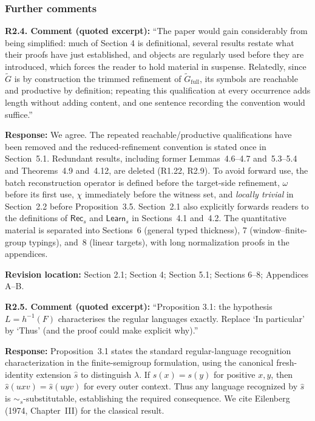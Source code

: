 \documentclass[
  10pt,
  a4paper,
]{article}
\begin{document}
\subsubsection{Further comments}\label{further-comments}

\textbf{R2.4. Comment (quoted excerpt):} ``The paper would gain considerably
from being simplified: much of Section 4 is definitional, several
results restate what their proofs have just established, and objects are
regularly used before they are introduced, which forces the reader to
hold material in suspense. Relatedly, since $\tilde G$ is by
construction the trimmed refinement of $\tilde G_{\mathrm{full}}$,
its symbols are reachable and productive by definition; repeating this
qualification at every occurrence adds length without adding content,
and one sentence recording the convention would suffice.''

\textbf{Response:} We agree. The repeated reachable/productive
qualifications have been removed and the reduced-refinement convention is
stated once in Section~5.1. Redundant results, including former
Lemmas~4.6--4.7 and~5.3--5.4 and Theorems~4.9 and~4.12, are deleted
(R1.22, R2.9). To avoid forward use,
the batch reconstruction operator is defined before the target-side
refinement, $\omega$ before its first use, $\chi$ immediately before the
witness set, and \emph{locally trivial} in Section~2.2 before
Proposition~3.5. Section~2.1 also explicitly forwards readers
to the definitions of $\mathsf{Rec}_s$ and $\mathsf{Learn}_s$
in Sections~4.1 and~4.2. The quantitative material is separated into Sections~6
(general typed thickness), 7 (window--finite-group typings), and~8
(linear targets), with long normalization proofs in the appendices.

\textbf{Revision location:} Section 2.1; Section 4; Section 5.1; Sections 6--8; Appendices A--B.


\textbf{R2.5. Comment (quoted excerpt):} ``Proposition 3.1: the hypothesis
\(L=h^{-1}(F)\) characterises the regular languages exactly. Replace `In
particular' by `Thus' (and the proof could make explicit why).''

\textbf{Response:} Proposition~3.1 states the standard regular-language
recognition characterization in the finite-semigroup formulation,
using the canonical fresh-identity extension $\widehat s$ to
distinguish $\lambda$. If $s(x)=s(y)$ for positive $x,y$,
then $\widehat s(uxv)=\widehat s(uyv)$ for every outer context.
Thus any language recognized by $\widehat s$ is
$\sim_s$-substitutable, establishing the required consequence.
We cite Eilenberg (1974, Chapter~III) for the classical result.
\end{document}
